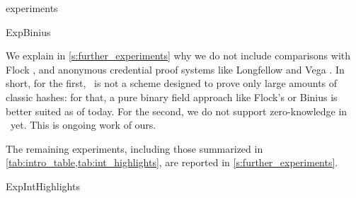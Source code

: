 \begin{lncsappendix}{experiments}
\begin{lncsmove}{ExpBinius}
\iflncs

We explain in \cref{s:further_experiments} why we do not include comparisons with Flock \cite{flock}, and anonymous credential proof systems like Longfellow \cite{longfellow} and Vega \cite{vega}. In short, for the first, \ftwoz \ is not a scheme designed to prove only large amounts of classic hashes: for that, a pure binary field approach like Flock's or Binius is better suited as of today. For the second, we do not support zero-knowledge in \ftwoz\ yet. This is ongoing work of ours.

The remaining experiments, including those summarized in \cref{tab:intro_table,tab:int_highlights}, are reported in \cref{s:further_experiments}.

\fi
\end{lncsmove}

\begin{lncstable}{ExpIntHighlights}


\end{lncstable}
\end{lncsappendix}
